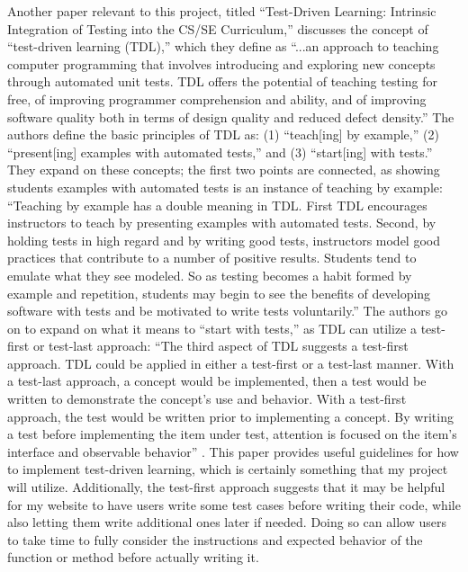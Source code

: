 \documentclass[10pt,twocolumn]{article}
\begin{document}
Another paper relevant to this project, titled “Test-Driven Learning: Intrinsic Integration of Testing into the CS/SE Curriculum,” discusses the concept of “test-driven learning (TDL),” which they define as “...an approach to teaching computer programming that involves introducing and exploring new concepts through automated unit tests. TDL offers the potential of teaching testing for free, of improving programmer comprehension and ability, and of improving software quality both in terms of design quality and reduced defect density.” The authors define the basic principles of TDL as: (1) “teach[ing] by example,” (2) “present[ing] examples with automated tests,” and (3) “start[ing] with tests.” They expand on these concepts; the first two points are connected, as showing students examples with automated tests is an instance of teaching by example: “Teaching by example has a double meaning in TDL. First TDL encourages instructors to teach by presenting examples with automated tests. Second, by holding tests in high regard and by writing good tests, instructors model good practices that contribute to a number of positive results. Students tend to emulate what they see modeled. So as testing becomes a habit formed by example and repetition, students may begin to see the benefits of developing software with tests and be motivated to write tests voluntarily.” The authors go on to expand on what it means to “start with tests,” as TDL can utilize a test-first or test-last approach: “The third aspect of TDL suggests a test-first approach. TDL could be applied in either a test-first or a test-last manner. With a test-last approach, a concept would be implemented, then a test would be written to demonstrate the concept’s use and behavior. With a test-first approach, the test would be written prior to implementing a concept. By writing a test before implementing the item under test, attention is focused on the item’s interface and observable behavior” \cite{Test-driven}. This paper provides useful guidelines for how to implement test-driven learning, which is certainly something that my project will utilize. Additionally, the test-first approach suggests that it may be helpful for my website to have users write some test cases before writing their code, while also letting them write additional ones later if needed. Doing so can allow users to take time to fully consider the instructions and expected behavior of the function or method before actually writing it.
\end{document}
